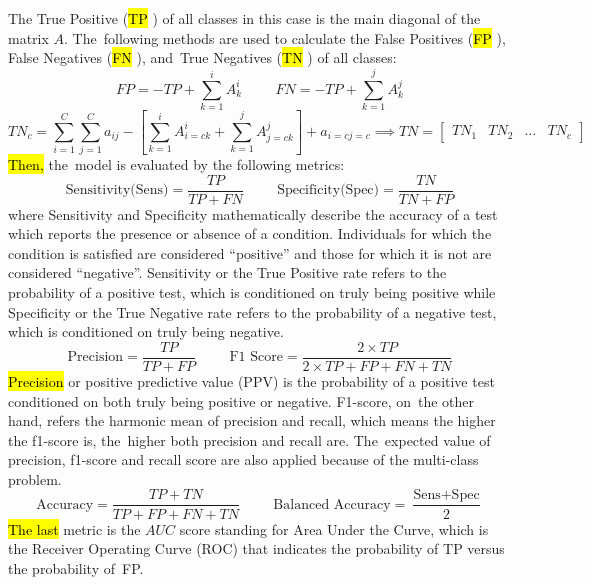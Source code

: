 \documentclass[sensors,article,accept,pdftex,moreauthors]{Definitions/mdpi}
\begin{document}
The True Positive (\hl{TP}%
) of all classes in this case is the main diagonal of the matrix $A$. The~following methods are used to calculate the False Positives (\hl{FP}%
), False Negatives (\hl{FN}%
), and~True Negatives (\hl{TN}%
) of all classes:
\[
FP = -TP + \sum_{k=1}^{i}A^i_k \hspace{1cm} FN = -TP + \sum_{k=1}^{j}A^j_k
\]
\[
TN_c = \sum_{i=1}^{C}\sum_{j=1}^{C}a_{ij} - \left[ \sum_{k=1}^{i}A^i_{i=c k} + \sum_{k=1}^{j}A^j_{j=c k} \right] + a_{i=c j=c} \implies TN = \begin{bmatrix}
	TN_1 & TN_2 & \dots & TN_c
\end{bmatrix}
\]
\hl{Then,} %
 the~model is evaluated by the following metrics:
\[\text{Sensitivity(Sens)} = \frac{TP}{TP + FN} \hspace{1cm} \text{Specificity(Spec)} = \frac{TN}{TN + FP}\]
where Sensitivity and Specificity mathematically describe the accuracy of a test which reports the presence or absence of a condition. Individuals for which the condition is satisfied are considered ``positive'' and those for which it is not are considered ``negative''. Sensitivity or the True Positive rate refers to the probability of a positive test, which is conditioned on truly being positive while Specificity  or the True Negative rate refers to the probability of a negative test, which is conditioned on truly being negative.
\[\text{Precision} = \frac{TP}{TP + FP} \hspace{1cm} \text{F1 Score} = \frac{2 \times TP}{2 \times TP + FP + FN + TN}\]
\hl{Precision} %
 or positive predictive value (PPV) is the probability of a positive test conditioned on both truly being positive or negative. F1-score, on~the other hand, refers the harmonic mean of precision and recall, which means the higher the f1-score is, the~higher both precision and recall are. The~expected value of precision, f1-score and recall score are also applied because of the multi-class problem.
\[\text{Accuracy} = \frac{TP + TN}{TP + FP + FN + TN} \hspace{1cm} \text{Balanced Accuracy} = \frac{\text{Sens} + \text{Spec}}{2}\]
\hl{The last} %
 metric is the $AUC$ score standing for Area Under the Curve, which is the Receiver Operating Curve (ROC) that indicates the probability of TP versus the probability of~FP.  
\end{document}
